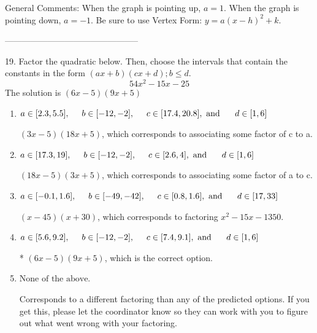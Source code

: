 \documentclass{article}[14pt]
\begin{document}
General Comments: When the graph is pointing up, $a=1$. When the graph is pointing down, $a=-1$. Be sure to use Vertex Form: $y = a(x-h)^2+k$.

-----------------------------------------------

19. Factor the quadratic below. Then, choose the intervals that contain the constants in the form $(ax+b)(cx+d); b \leq d.$
$$ 54x^{2} -15 x -25 $$ 
The solution is $ (6x -5)(9x + 5) $ 

\begin{enumerate}[label=\Alph*.] 
\item $ a \in [2.3, 5.5], \hspace*{5mm} b \in [-12, -2], \hspace*{5mm} c \in [17.4, 20.8], \text{ and } \hspace*{5mm} d \in [1, 6] $ 

  $(3x -5)(18x + 5)$, which corresponds to associating some factor of c to a. 
\item $ a \in [17.3, 19], \hspace*{5mm} b \in [-12, -2], \hspace*{5mm} c \in [2.6, 4], \text{ and } \hspace*{5mm} d \in [1, 6] $ 

  $(18x -5)(3x + 5)$, which corresponds to associating some factor of a to c. 
\item $ a \in [-0.1, 1.6], \hspace*{5mm} b \in [-49, -42], \hspace*{5mm} c \in [0.8, 1.6], \text{ and } \hspace*{5mm} d \in [17, 33] $ 

  $(x -45)(x + 30)$, which corresponds to factoring $x^{2} -15 x -1350$. 
\item $ a \in [5.6, 9.2], \hspace*{5mm} b \in [-12, -2], \hspace*{5mm} c \in [7.4, 9.1], \text{ and } \hspace*{5mm} d \in [1, 6] $ 

 * $(6x -5)(9x + 5)$, which is the correct option. 
\item $ \text{None of the above.} $ 

  Corresponds to a different factoring than any of the predicted options. If you get this, please let the coordinator know so they can work with you to figure out what went wrong with your factoring. 
\end{enumerate} 
 
\end{document}
